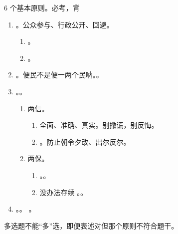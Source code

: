 \begin{enumerate}
\begin{kk}{6 个基本原则。必考，背}
\begin{enumerate}
\begin{enumerate}
                    \item 公平公正（平等）。同等情况同等对待；差别情况差别对待（实质平等）。
                    \item 相关原则。要有正当的、实质的关联。
                    \item 比例原则。少侵害。。
                          \begin{enumerate}
                            \item 合目的性。为了公共利益。
                            \item 适当性。手段有助于实现目的。。
                            \item 必要性。对民众权益侵害最小。能不罚就不罚，能少罚就少罚。。
                          \end{enumerate}
                  \end{enumerate}
            \item {}。公众参与、行政公开、回避。
                  \begin{enumerate}
                    \item {}。
                    \item {}。
                  \end{enumerate}
            \item {}。便民不是便一两个民呐。。
            \item {}。。
                  \begin{enumerate}
                    \item 两信。
                          \begin{enumerate}
                            \item 全面、准确、真实。别撒谎，别反悔。
                            \item {}。防止朝令夕改、出尔反尔。
                          \end{enumerate}
                    \item 两保。
                          \begin{enumerate}
                            \item {}。。
                            \item 没办法存续 \yjt {}。。
                          \end{enumerate}
                  \end{enumerate}
            \item {}。。
                  。
          \end{enumerate}
          \tcblower
          多选题不能“多”选，即便表述对但那个原则不符合题干。
        \end{kk}
\end{enumerate}
